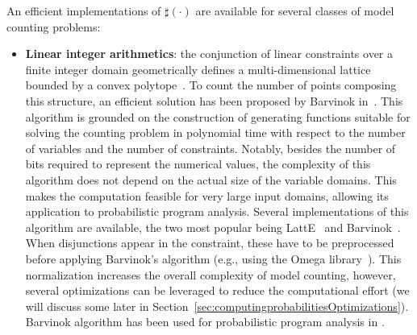 An efficient implementations of $\sharp(\cdot)$ are available for several classes of model counting problems:

\begin{itemize}
	\item \textbf{Linear integer arithmetics}: the conjunction of linear constraints over a finite integer domain geometrically defines a multi-dimensional lattice bounded by a convex polytope~\cite{de2008computationalGeometry}. To count the number of points composing this structure, an efficient solution has been proposed by Barvinok in~\cite{barvinok1994polynomial}. This algorithm is grounded on the construction of generating functions suitable for solving the counting problem in polynomial time with respect to the number of variables and the number of constraints. Notably, besides the number of bits required to represent the numerical values, the complexity of this algorithm does not depend on the actual size of the variable domains. This makes the computation feasible for very large input domains, allowing its application to probabilistic program analysis. Several implementations of this algorithm are available, the two most popular being LattE~\cite{LattESoftware} and Barvinok~\cite{verdoolaegesoftware}. When disjunctions appear in the constraint, these have to be preprocessed before applying Barvinok's algorithm (e.g., using the Omega library~\cite{Omega1996}). This normalization increases the overall complexity of model counting, however, several optimizations can be leveraged to reduce the computational effort (we will discuss some later in Section~\ref{sec:computingprobabilitiesOptimizations}). Barvinok algorithm has been used for probabilistic program analysis in \cite{Geldenhuys2012,Filieri2013,Filieri2015}.


\end{itemize}
